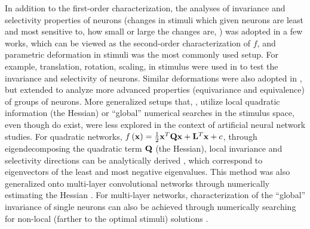 \documentclass[10pt,twocolumn,letterpaper]{article}
\begin{document}
In addition to the first-order characterization, the analyses of invariance and selectivity properties of neurons (\eg changes in stimuli which given neurons are least and most sensitive to, how small or large the changes are, \etc) was adopted in a few works, which can be viewed as the second-order characterization of $f$, and parametric deformation in stimuli was the most commonly used setup.
For example, translation, rotation, scaling, \etc in stimulus were used in \cite{goodfellow2009measuring, zeiler2014visualizing} to test the invariance and selectivity of neurons.
Similar deformations were also adopted in \cite{lenc2014understanding}, but extended to analyze more advanced properties (\ie equivariance and equivalence) of groups of neurons.
More generalized setups that, \eg, utilize local quadratic information (\ie the Hessian) or ``global'' numerical searches in the stimulus space, even though do exist, were less explored in the context of artificial neural network studies.
For quadratic networks, \ie $f\left({\bf{x}}\right) = \frac{1}{2}{\bf{x}}^{T}{\bf{Qx}}+{\bf{L}}^{T}{\bf{x}}+c$, through eigendecomposing the quadratic term $\bf{Q}$ (\ie the Hessian), local invariance and selectivity directions can be analytically derived \cite{berkes2006analysis}, which correspond to eigenvectors of the least and most negative eigenvalues.
This method was also generalized onto multi-layer convolutional networks through numerically estimating the Hessian \cite{ngiam2010tiled}.
For multi-layer networks, characterization of the ``global'' invariance of single neurons can also be achieved through numerically searching for non-local (\ie farther to the optimal stimuli) solutions \cite{erhan2010understanding}.


\end{document}
